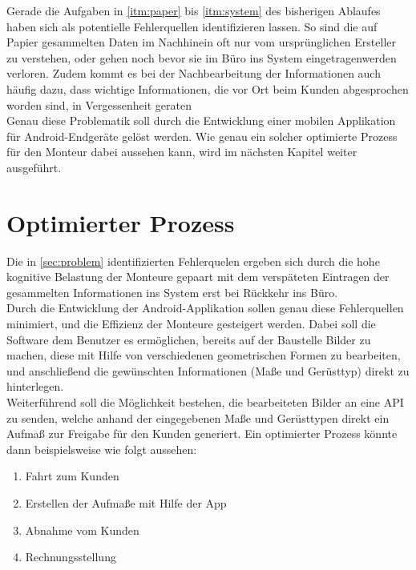 Gerade die Aufgaben in \autoref{itm:paper} bis \autoref{itm:system} des bisherigen Ablaufes haben sich als potentielle Fehlerquellen identifizieren lassen.
So sind die auf Papier gesammelten Daten im Nachhinein oft nur vom ursprünglichen Ersteller zu verstehen, oder gehen noch bevor sie im Büro ins System eingetragenwerden verloren.
Zudem kommt es bei der Nachbearbeitung der Informationen auch häufig dazu, dass wichtige Informationen, die vor Ort beim Kunden abgesprochen worden sind, in Vergessenheit geraten  \\

Genau diese Problematik soll durch die Entwicklung einer mobilen Applikation für Android-Endgeräte gelöst werden.
Wie genau ein solcher optimierte Prozess für den Monteur dabei aussehen kann, wird im nächsten Kapitel weiter ausgeführt.

\section{Optimierter Prozess}
Die in \autoref{sec:problem} identifizierten Fehlerquelen ergeben sich durch die hohe kognitive Belastung der Monteure gepaart mit dem verspäteten Eintragen der gesammelten Informationen ins System erst bei Rückkehr ins Büro. \\

Durch die Entwicklung der Android-Applikation sollen genau diese Fehlerquellen minimiert, und die Effizienz der Monteure gesteigert werden.
Dabei soll die Software dem Benutzer es ermöglichen, bereits auf der Baustelle Bilder zu machen, diese mit Hilfe von verschiedenen geometrischen Formen zu bearbeiten, und anschließend die gewünschten Informationen (Maße und Gerüsttyp) direkt zu hinterlegen. \\

Weiterführend soll die Möglichkeit bestehen, die bearbeiteten Bilder an eine API  zu senden, welche anhand der eingegebenen Maße und Gerüsttypen direkt ein Aufmaß zur Freigabe für den Kunden generiert.
Ein optimierter Prozess könnte dann beispielsweise wie folgt aussehen:

\begin{enumerate}
  \item Fahrt zum Kunden
  \item Erstellen der Aufmaße mit Hilfe der App
  \item Abnahme vom Kunden
  \item Rechnungsstellung
\end{enumerate} 

